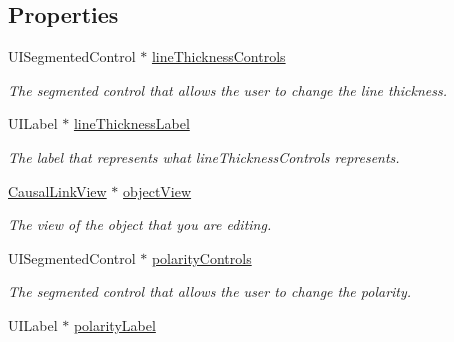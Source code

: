 \subsection*{Properties}
\begin{DoxyCompactItemize}
\item 
\hypertarget{interface_causal_link_edit_menu_view_abf252978f516cd3031621f8b4dbc55a1}{U\-I\-Segmented\-Control $\ast$ \hyperlink{interface_causal_link_edit_menu_view_abf252978f516cd3031621f8b4dbc55a1}{line\-Thickness\-Controls}}\label{interface_causal_link_edit_menu_view_abf252978f516cd3031621f8b4dbc55a1}

\begin{DoxyCompactList}\small\item\em The segmented control that allows the user to change the line thickness. \end{DoxyCompactList}\item 
\hypertarget{interface_causal_link_edit_menu_view_a435537f3bc8e923f4eb7d1d943f9eadc}{U\-I\-Label $\ast$ \hyperlink{interface_causal_link_edit_menu_view_a435537f3bc8e923f4eb7d1d943f9eadc}{line\-Thickness\-Label}}\label{interface_causal_link_edit_menu_view_a435537f3bc8e923f4eb7d1d943f9eadc}

\begin{DoxyCompactList}\small\item\em The label that represents what line\-Thickness\-Controls represents. \end{DoxyCompactList}\item 
\hypertarget{interface_causal_link_edit_menu_view_a930d57d36d2318aaf652f8914afd17bf}{\hyperlink{interface_causal_link_view}{Causal\-Link\-View} $\ast$ \hyperlink{interface_causal_link_edit_menu_view_a930d57d36d2318aaf652f8914afd17bf}{object\-View}}\label{interface_causal_link_edit_menu_view_a930d57d36d2318aaf652f8914afd17bf}

\begin{DoxyCompactList}\small\item\em The view of the object that you are editing. \end{DoxyCompactList}\item 
\hypertarget{interface_causal_link_edit_menu_view_a084f50dc82d79d565c48f15bb3b7746d}{U\-I\-Segmented\-Control $\ast$ \hyperlink{interface_causal_link_edit_menu_view_a084f50dc82d79d565c48f15bb3b7746d}{polarity\-Controls}}\label{interface_causal_link_edit_menu_view_a084f50dc82d79d565c48f15bb3b7746d}

\begin{DoxyCompactList}\small\item\em The segmented control that allows the user to change the polarity. \end{DoxyCompactList}\item 
\hypertarget{interface_causal_link_edit_menu_view_adf6a823fbc18324bccd978afe58a26b1}{U\-I\-Label $\ast$ \hyperlink{interface_causal_link_edit_menu_view_adf6a823fbc18324bccd978afe58a26b1}{polarity\-Label}}\label{interface_causal_link_edit_menu_view_adf6a823fbc18324bccd978afe58a26b1}


\end{DoxyCompactItemize}

